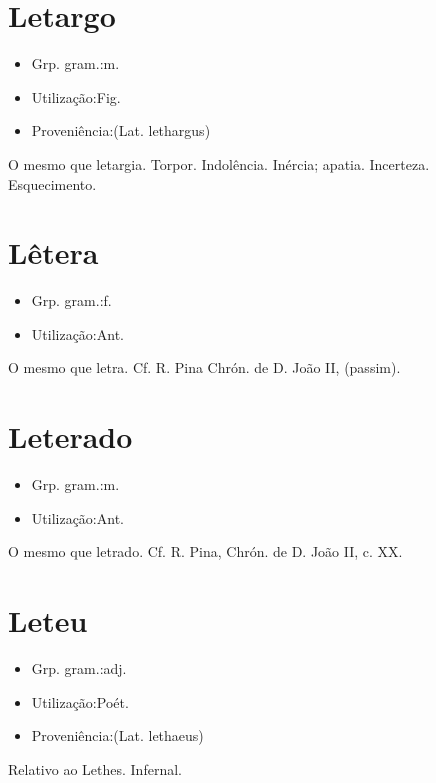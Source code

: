 \section{Letargo}
\begin{itemize}
\item {Grp. gram.:m.}
\end{itemize}
\begin{itemize}
\item {Utilização:Fig.}
\end{itemize}
\begin{itemize}
\item {Proveniência:(Lat. \textunderscore lethargus\textunderscore )}
\end{itemize}
O mesmo que \textunderscore letargia\textunderscore .
Torpor.
Indolência.
Inércia; apatia.
Incerteza.
Esquecimento.
\section{Lêtera}
\begin{itemize}
\item {Grp. gram.:f.}
\end{itemize}
\begin{itemize}
\item {Utilização:Ant.}
\end{itemize}
O mesmo que \textunderscore letra\textunderscore . Cf. R. Pina \textunderscore Chrón. de D. João II\textunderscore , (passim).
\section{Leterado}
\begin{itemize}
\item {Grp. gram.:m.}
\end{itemize}
\begin{itemize}
\item {Utilização:Ant.}
\end{itemize}
O mesmo que \textunderscore letrado\textunderscore . Cf. R. Pina, \textunderscore Chrón. de D. João II\textunderscore , c. XX.
\section{Leteu}
\begin{itemize}
\item {Grp. gram.:adj.}
\end{itemize}
\begin{itemize}
\item {Utilização:Poét.}
\end{itemize}
\begin{itemize}
\item {Proveniência:(Lat. \textunderscore lethaeus\textunderscore )}
\end{itemize}
Relativo ao Lethes.
Infernal.
